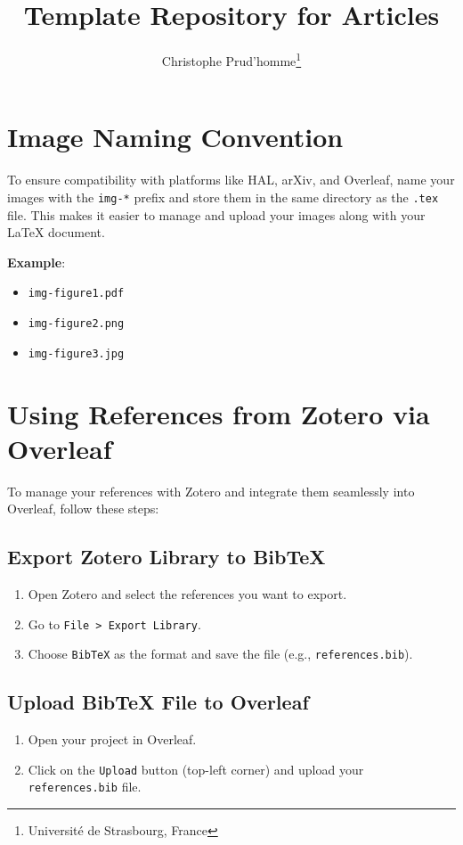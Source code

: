 \documentclass[a4paper]{article}
\begin{document}
\title{Template Repository for Articles}
\author{Christophe Prud'homme\thanks{Université de Strasbourg, France}}
\maketitle

\section{Image Naming Convention}

To ensure compatibility with platforms like HAL, arXiv, and Overleaf, name your images with the \texttt{img-*} prefix and store them in the same directory as the \texttt{.tex} file. This makes it easier to manage and upload your images along with your LaTeX document.

\textbf{Example}:
\begin{itemize}
    \item \texttt{img-figure1.pdf}
    \item \texttt{img-figure2.png}
    \item \texttt{img-figure3.jpg}
\end{itemize}

\section{Using References from Zotero via Overleaf}

To manage your references with Zotero and integrate them seamlessly into Overleaf, follow these steps:

\subsection{Export Zotero Library to BibTeX}
\begin{enumerate}
    \item Open Zotero and select the references you want to export.
    \item Go to \texttt{File > Export Library}.
    \item Choose \texttt{BibTeX} as the format and save the file (e.g., \texttt{references.bib}).
\end{enumerate}

\subsection{Upload BibTeX File to Overleaf}
\begin{enumerate}
    \item Open your project in Overleaf.
    \item Click on the \texttt{Upload} button (top-left corner) and upload your \texttt{references.bib} file.
\end{enumerate}
\end{document}
